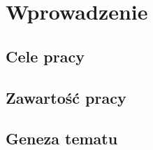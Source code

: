 \chapter{Wprowadzenie}
\label{cha:wprowadzenie}


\section{Cele pracy}
\label{sec:celePracy}


\section{Zawartość pracy}
\label{sec:zawartoscPracy}


\section{Geneza tematu}
\label{sec:genezaTematu}
